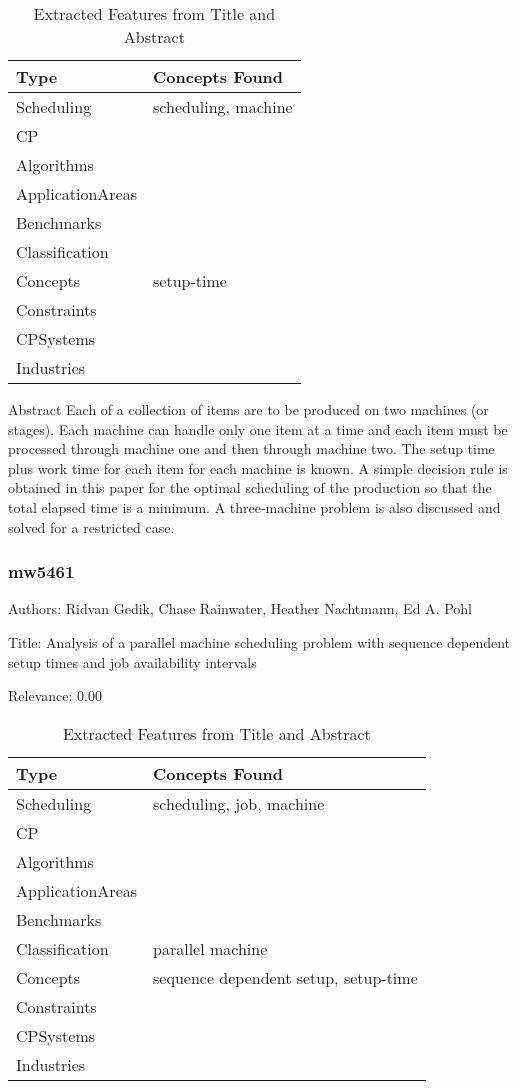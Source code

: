 {\scriptsize
\begin{longtable}{p{2cm}p{20cm}}
\caption{Extracted Features from Title and Abstract}\\ \toprule
Type & Concepts Found\\ \midrule
\endhead
\bottomrule
\endfoot
Scheduling & scheduling, machine\\ 
CP & \\ 
Algorithms & \\ 
ApplicationAreas & \\ 
Benchmarks & \\ 
Classification & \\ 
Concepts & setup-time\\ 
Constraints & \\ 
CPSystems & \\ 
Industries & \\ 
\end{longtable}
}

 Abstract  Each of a collection of items are to be produced on two machines (or stages). Each machine can handle only one item at a time and each item must be processed through machine one and then through machine two. The setup time plus work time for each item for each machine is known. A simple decision rule is obtained in this paper for the optimal scheduling of the production so that the total elapsed time is a minimum. A three‐machine problem is also discussed and solved for a restricted case. 

\subsubsection{mw5461}
\label{mw:mw5461}

Authors: Ridvan Gedik, Chase Rainwater, Heather Nachtmann, Ed A. Pohl

Title: Analysis of a parallel machine scheduling problem with sequence dependent setup times and job availability intervals

Relevance:  0.00

{\scriptsize
\begin{longtable}{p{2cm}p{20cm}}
\caption{Extracted Features from Title and Abstract}\\ \toprule
Type & Concepts Found\\ \midrule
\endhead
\bottomrule
\endfoot
Scheduling & scheduling, job, machine\\ 
CP & \\ 
Algorithms & \\ 
ApplicationAreas & \\ 
Benchmarks & \\ 
Classification & parallel machine\\ 
Concepts & sequence dependent setup, setup-time\\ 
Constraints & \\ 
CPSystems & \\ 
Industries & \\ 
\end{longtable}
}



